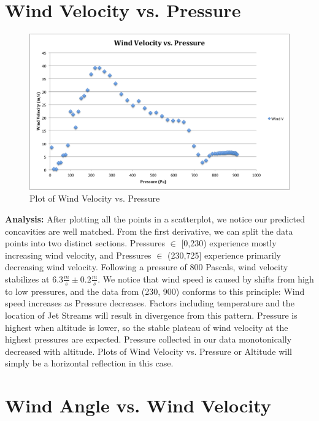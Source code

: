 \documentclass{journal}
\begin{document}
\part{Wind Velocity vs. Pressure}
\begin{figure}[H]
\centering
\includegraphics[width=5in]{IMG1CDATA.png}
\caption{Plot of Wind Velocity vs. Pressure}
\end{figure}

\begin{flushleft}
\textbf{Analysis:} After plotting all the points in a scatterplot, we notice our predicted concavities are well matched.  From the first derivative, we can split the data points into two distinct sections.  Pressures $\in$ [0,230) experience mostly increasing wind velocity, and Pressures $\in$ (230,725] experience primarily decreasing wind velocity.  Following a pressure of 800 Pascals, wind velocity stabilizes at $6.3\frac{m}{s} \pm 0.2\frac{m}{s}$.  We notice that wind speed is caused by shifts from high to low pressures, and the data from (230, 900) conforms to this principle: Wind speed increases as Pressure decreases.  Factors including temperature and the location of Jet Streams will result in divergence from this pattern.  Pressure is highest when altitude is lower, so the stable plateau of wind velocity at the highest pressures are expected.  Pressure collected in our data monotonically decreased with altitude.  Plots of Wind Velocity vs. Pressure or Altitude will simply be a horizontal reflection in this case.  
\end{flushleft}
\part{Wind Angle vs. Wind Velocity}
\end{document}

